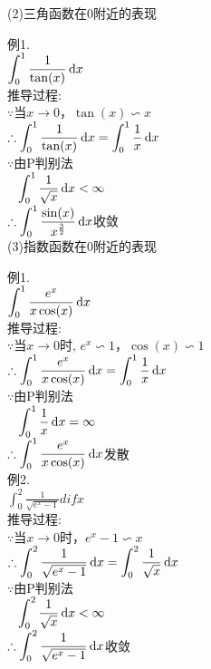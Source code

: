 (2)三角函数在$0$附近的表现
{\par\centering
{}
\par}
例1.\\
$\displaystyle\int_0^1\frac{1}{\tan(x)}\mathop{}\!\mathrm{d} x$\\
推导过程:\\
$\because$当$x\to 0$，$\tan(x)\backsim x$\\
$\displaystyle\therefore\int_0^1\frac{1}{\tan(x)}\mathop{}\!\mathrm{d} x=\int_0^1\frac{1}{x}\mathop{}\!\mathrm{d} x$\\
$\because$由P判别法\\
$\displaystyle\phantom{\because}\int_0^1\frac{1}{\sqrt{x}}\mathop{}\!\mathrm{d} x<\infty$\\
$\displaystyle\therefore\int_0^1\frac{\sin(x)}{x^{\frac{3}{2}}}\mathop{}\!\mathrm{d} x$收敛\\[2ex]

(3)指数函数在$0$附近的表现
{\par\centering
{}
\par}
例1.\\
$\displaystyle\int_0^1\frac{e^x}{x\cos(x)}\mathop{}\!\mathrm{d} x$\\
推导过程:\\
$\because$当$x\to 0$时, $e^x\backsim 1$，$\cos(x)\backsim 1$\\
$\displaystyle\therefore\int_0^1\frac{e^x}{x\cos(x)}\mathop{}\!\mathrm{d} x=\int_0^1\frac{1}{x}\mathop{}\!\mathrm{d} x$\\
$\because$由P判别法\\
$\displaystyle\phantom{\because}\int_0^1\frac{1}{x}\mathop{}\!\mathrm{d} x=\infty$\\
$\displaystyle\therefore\int_0^1\frac{e^x}{x\cos(x)}\mathop{}\!\mathrm{d} x$发散\\[1ex]

例2.\\
$\displaystyle\int_0^2\frac{1}{\sqrt{e^x-1}}dif x$\\
推导过程:\\
$\because$当$x\to 0$时，$e^x-1\backsim x$\\
$\displaystyle\therefore\int_0^2\frac{1}{\sqrt{e^x-1}}\mathop{}\!\mathrm{d} x=\int_0^2\frac{1}{\sqrt{x}}\mathop{}\!\mathrm{d} x$\\
$\because$由P判别法\\
$\displaystyle\phantom{\because}\int_0^2\frac{1}{\sqrt{x}}\mathop{}\!\mathrm{d} x<\infty$\\
$\displaystyle\therefore\int_0^2\frac{1}{\sqrt{e^x-1}}\mathop{}\!\mathrm{d} x$收敛\\[2ex]

